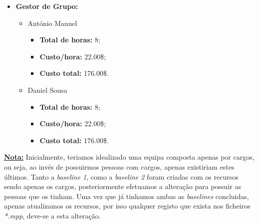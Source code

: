 \begin{itemize}
	\item \textbf{Gestor de Grupo:}
		\begin{itemize}
			\item António Manuel
				\begin{itemize}
					\item \textbf{Total de horas:} 8;
					\item \textbf{Custo/hora:} 22.00\$;
					\item \textbf{Custo total:} 176.00\$.
				\end{itemize}
			\item Daniel Sousa
				\begin{itemize}
					\item \textbf{Total de horas:} 8;
					\item \textbf{Custo/hora:} 22.00\$;
					\item \textbf{Custo total:} 176.00\$.
				\end{itemize}
		\end{itemize}
\end{itemize}

\underline{\textbf{Nota:}} Inicialmente, teriamos idealizado uma equipa composta apenas por cargos, ou seja, ao invés de possuirmos pessoas com cargos, apenas existiriam estes últimos. Tanto a \textit{baseline 1}, como a \textit{baseline 2} foram criadas com os recursos sendo apenas os cargos, posteriormente efetuamos a alteração para possuir as pessoas que os tinham. Uma vez que já tinhamos ambas as \textit{baselines} concluidas, apenas atualizamos os recursos, por isso qualquer registo que exista nos ficheiros \textit{*.mpp}, deve-se a esta alteração.

